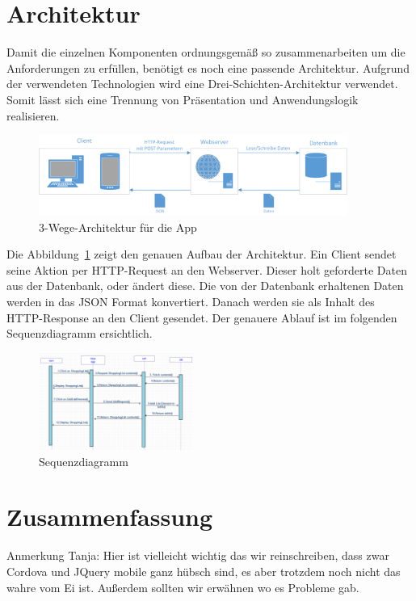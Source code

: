 \documentclass[10pt, conference, compsocconf]{IEEEtran}
\begin{document}
\section{Architektur}
{Damit die einzelnen Komponenten ordnungsgem\"a{\ss} so zusammenarbeiten um die Anforderungen zu erf\"ullen, ben\"otigt es noch eine passende Architektur. Aufgrund der verwendeten Technologien wird eine Drei-Schichten-Architektur verwendet. Somit l\"asst sich eine Trennung von Pr\"asentation und Anwendungslogik realisieren.
\begin{figure}[tb!]
	\centering
	\includegraphics[width=0.9\textwidth]{./Bilder_Zeichnungen/Architektur.png}
	\caption{3-Wege-Architektur f\"ur die App}
	\label{fig:Architektur}
\end{figure}

Die Abbildung~\ref{fig:Architektur} zeigt den genauen Aufbau der Architektur. Ein Client sendet seine Aktion per HTTP-Request an den Webserver. Dieser holt geforderte Daten aus der Datenbank, oder \"andert diese. Die von der Datenbank erhaltenen Daten werden in das JSON Format konvertiert. Danach werden sie als Inhalt des HTTP-Response an den Client gesendet. Der genauere Ablauf ist im folgenden Sequenzdiagramm ersichtlich.
\begin{figure}[h!]
	\centering
	\includegraphics[width=0.45\textwidth]{./Bilder_Zeichnungen/Sequenzdiagramm.png}
	\caption{Sequenzdiagramm}
	\label{fig:Sequenzdiagramm}
\end{figure}

\section{Zusammenfassung}
Anmerkung Tanja: Hier ist vielleicht wichtig das wir reinschreiben, dass zwar Cordova und JQuery mobile ganz h\"ubsch sind, es aber trotzdem noch nicht das wahre vom Ei ist. Au{\ss}erdem sollten wir erw\"ahnen wo es Probleme gab.

}
\end{document}
